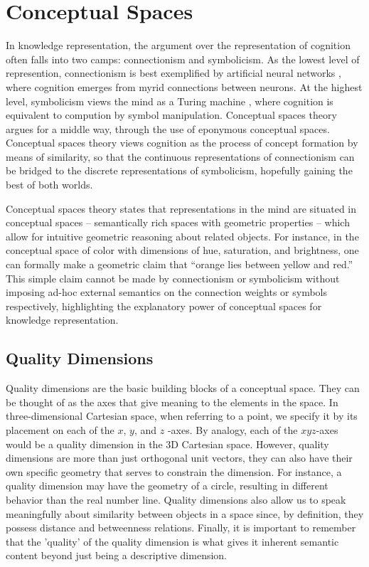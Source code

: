 \section{Conceptual Spaces}
\label{section:conceptual-spaces}

In knowledge representation, the argument over the representation of cognition often falls into two camps: connectionism and symbolicism.  As the lowest level of represention, connectionism is best exemplified by artificial neural networks \citep{lecun2015deep}, where cognition emerges from myrid connections between neurons.  At the highest level, symbolicism views the mind as a Turing machine \citep{turing2009computing}, where cognition is equivalent to compution by symbol manipulation.  Conceptual spaces theory \citep{gardenfors2004conceptual} argues for a middle way, through the use of eponymous conceptual spaces.  Conceptual spaces theory views cognition as the process of concept formation by means of similarity, so that the continuous representations of connectionism can be bridged to the discrete representations of symbolicism, hopefully gaining the best of both worlds.  

Conceptual spaces theory states that representations in the mind are situated in conceptual spaces -- semantically rich spaces with geometric properties -- which allow for intuitive geometric reasoning about related objects. For instance, in the conceptual space of color with dimensions of hue, saturation, and brightness, one can formally make a geometric claim that “orange lies between yellow and red.”  This simple claim cannot be made by connectionism or symbolicism without imposing ad-hoc external semantics on the connection weights or symbols respectively, highlighting the explanatory power of conceptual spaces for knowledge representation.

\subsection{Quality Dimensions}
\label{section:quality-dimensions}

Quality dimensions are the basic building blocks of a conceptual space.  They can be thought of as the axes that give meaning to the elements in the space.  In three-dimensional Cartesian space, when referring to a point, we specify it by its placement on each of the $x$, $y$, and $z$ -axes.  By analogy, each of the $xyz$-axes would be a quality dimension in the 3D Cartesian space.  However, quality dimensions are more than just orthogonal unit vectors, they can also have their own specific geometry that serves to constrain the dimension. For instance, a quality dimension may have the geometry of a circle, resulting in different behavior than the real number line.  Quality dimensions also allow us to speak meaningfully about similarity between objects in a space since, by definition, they possess distance and betweenness relations.  Finally, it is important to remember that the 'quality' of the quality dimension is what gives it inherent semantic content beyond just being a descriptive dimension.

